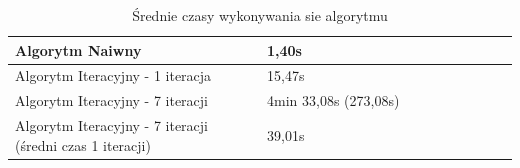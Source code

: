 \begin{table}[h!]
    \centering
    \begin{tabular}{|p{0.5\linewidth}|p{0.5\linewidth}|}
        \hline
        Algorytm Naiwny & 1,40s \\
        \hline
        Algorytm Iteracyjny - 1 iteracja & 15,47s \\
        \hline
        Algorytm Iteracyjny - 7 iteracji & 4min 33,08s (273,08s) \\
        \hline
        Algorytm Iteracyjny - 7 iteracji (średni czas 1 iteracji) & 39,01s \\
        \hline
    \end{tabular}
    \caption{Średnie czasy wykonywania sie algorytmu}
    \label{tab:czasy1}
\end{table}



